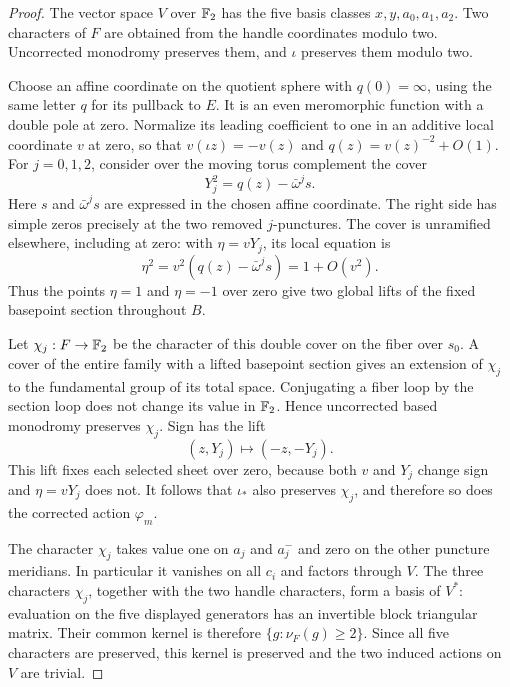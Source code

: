 \begin{proof}
The vector space $V$ over $\mathbb F_2$ has the five basis classes
$x,y,a_0,a_1,a_2$.  Two characters of $F$ are obtained from the
handle coordinates modulo two.  Uncorrected monodromy preserves
them, and $\iota$ preserves them modulo two.

Choose an affine coordinate on the quotient sphere with
$q(0)=\infty$, using the same letter $q$ for its pullback to $E$.
It is an even meromorphic function with a double pole at zero.
Normalize its leading coefficient to one in an additive local
coordinate $v$ at zero, so that
$v(\iota z)=-v(z)$ and $q(z)=v(z)^{-2}+O(1)$.
For $j=0,1,2$, consider over the moving torus complement the cover
\begin{equation}\label{eq:character-cover}
 Y_j^2=q(z)-\bar\omega^j s.
\end{equation}
Here $s$ and $\bar\omega^j s$ are expressed in the chosen affine
coordinate.  The right side has simple zeros precisely at the
two removed $j$-punctures.  The cover is unramified elsewhere,
including at zero: with $\eta=vY_j$, its local equation is
\[
 \eta^2=v^2(q(z)-\bar\omega^j s)=1+O(v^2).
\]
Thus the points $\eta=1$ and $\eta=-1$ over zero give two global
lifts of the fixed basepoint section throughout $B$.

Let $\chi_j:F\to\mathbb F_2$ be the character of this double cover on the
fiber over $s_0$.  A cover of the entire family with a lifted
basepoint section gives an extension of $\chi_j$ to the fundamental
group of its total space.  Conjugating a fiber loop by the section
loop does not change its value in $\mathbb F_2$.  Hence uncorrected based
monodromy preserves $\chi_j$.  Sign has the lift
\[
 (z,Y_j)\longmapsto(-z,-Y_j).
\]
This lift fixes each selected sheet over zero, because both $v$
and $Y_j$ change sign and $\eta=vY_j$ does not.  It follows that
$\iota_*$ also preserves $\chi_j$, and therefore so does the
corrected action $\varphi_m$.

The character $\chi_j$ takes value one on $a_j$ and $a_j^-$ and
zero on the other puncture meridians.  In particular it vanishes
on all $c_i$ and factors through $V$.  The three characters
$\chi_j$, together with the two handle characters, form a basis
of $V^*$: evaluation on the five displayed generators has an
invertible block triangular matrix.  Their common kernel is therefore
$\{g:\nu_F(g)\ge2\}$.  Since all five characters are preserved,
this kernel is preserved and the two induced actions on $V$ are trivial.
\end{proof}

